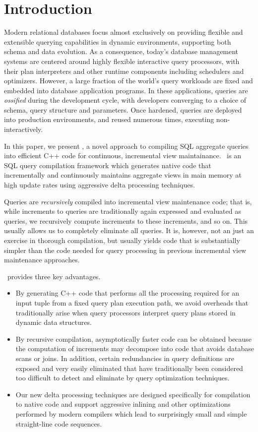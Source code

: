 \section{Introduction}
\label{sec:intro}

Modern relational databases focus almost exclusively on providing flexible and
extensible querying capabilities in dynamic environments, supporting both schema
and data evolution.  As a consequence, today's database management systems are
centered around highly flexible interactive query processors, with their plan
interpreters and other runtime components including schedulers and optimizers.
However, a large fraction of the world's query workloads are fixed and embedded
into database application programs. In these applications, queries are
\textit{ossified} during the development cycle, with developers converging to a
choice of schema, query structure and parameters. Once hardened, queries are
deployed into production environments, and re\-used numerous times, executing
non-interactively.

In this paper, we present \compiler, a novel approach to compiling SQL aggregate
queries into efficient C++ code for continuous, incremental view maintainance.
\compiler\ is an SQL query compilation framework which generates native code
that incrementally and continuously maintains aggregate views in main memory at
high update rates using aggressive delta processing techniques.

Queries are {\em recursively}\/ compiled into incremental view maintenance code;
that is, while increments to queries are traditionally again expressed and
evaluated as que\-ries, we recursively compute increments to these increments,
and so on. This usually allows us to completely eliminate all queries.  It is,
however, not an just an exercise in thorough compilation, but usually yields
code that is substantially simpler than the code needed for query processing in
previous incremental view maintenance approaches.

\compiler\ provides three key advantages.
\begin{itemize}
\item By generating C++ code that performs all the processing required for an
input tuple from a fixed query plan execution path, we avoid overheads that
traditionally arise when query processors interpret query plans stored in
dynamic data structures.

\item By recursive compilation, asymptotically faster code can be obtained
because the computation of increments may decompose into code that avoids
database scans or joins.
%
In addition, certain redundancies in query definitions are exposed and very
easily eliminated that have traditionally been considered too difficult to
detect and eliminate by query optimization techniques.

\item Our new delta processing techniques are designed specifically for
compilation to native code and support aggressive inlining and other
optimizations performed by modern compilers which lead to surprisingly small and
simple straight-line code sequences.
\end{itemize}



